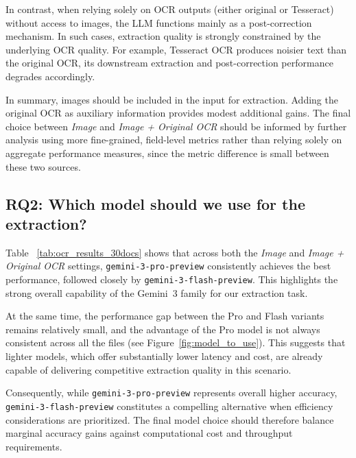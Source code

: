 In contrast, when relying solely on OCR outputs (either original or Tesseract) without access to images, the LLM functions mainly as a post-correction mechanism. In such cases, extraction quality is strongly constrained by the underlying OCR quality. For example, Tesseract OCR produces noisier text than the original OCR, its downstream extraction and post-correction performance degrades accordingly.

In summary, images should be included in the input for extraction. Adding the original OCR as auxiliary information provides modest additional gains. The final choice between \emph{Image} and \emph{Image + Original OCR} should be informed by further analysis using more fine-grained, field-level metrics rather than relying solely on aggregate performance measures, since the metric difference is small between these two sources.

\subsection{RQ2: Which model should we use for the extraction?}

Table ~\ref{tab:ocr_results_30docs} shows that across both the \emph{Image} and \emph{Image + Original OCR} settings, \texttt{gemini-3-pro-preview} consistently achieves the best performance, followed closely by \texttt{gemini-3-flash-preview}. This highlights the strong overall capability of the Gemini~3 family for our extraction task.

At the same time, the performance gap between the Pro and Flash variants remains relatively small, and the advantage of the Pro model is not always consistent across all the files (see Figure~\ref{fig:model_to_use}). This suggests that lighter models, which offer substantially lower latency and cost, are already capable of delivering competitive extraction quality in this scenario.

Consequently, while \texttt{gemini-3-pro-preview} represents overall higher accuracy, \texttt{gemini-3-flash-preview} constitutes a compelling alternative when efficiency considerations are prioritized. The final model choice should therefore balance marginal accuracy gains against computational cost and throughput requirements.

